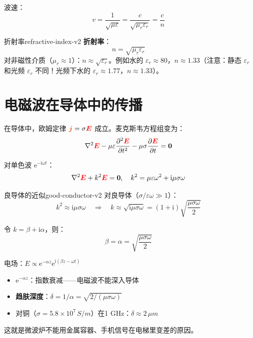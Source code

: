 \documentclass[11pt,a4paper,openany,oneside]{book}
\newcommand{\vecE}{\textcolor{red}{\vect{E}}}
\newcommand{\vecJ}{\textcolor{cororange}{\vect{j}}}
\newcommand{\ii}{\mathrm{i}}
\newcommand{\ee}{\mathrm{e}}
\newcommand{\eps}{\varepsilon}
\newcommand{\vect}[1]{\bm{#1}}
\newcommand{\lap}{\nabla^2}
\begin{document}
波速：
\[
v = \frac{1}{\sqrt{\mu\eps}} = \frac{c}{\sqrt{\mu_r\eps_r}} = \frac{c}{n}
\]

\begin{definition}{折射率}{refractive-index-v2}
\textbf{折射率}：
\[
n = \sqrt{\mu_r\eps_r}
\]
对非磁性介质（$\mu_r \approx 1$）：$n \approx \sqrt{\eps_r}$。例如水的 $\eps_r \approx 80$，$n \approx 1.33$（注意：静态 $\eps_r$ 和光频 $\eps_r$ 不同！光频下水的 $\eps_r \approx 1.77$，$n \approx 1.33$）。
\end{definition}

\section{电磁波在导体中的传播}

在导体中，欧姆定律 $\vecJ = \sigma\vecE$ 成立。麦克斯韦方程组变为：
\[
\lap\vecE - \mu\eps\frac{\partial^2\vecE}{\partial t^2} - \mu\sigma\frac{\partial\vecE}{\partial t} = \vect{0}
\]

对单色波 $\ee^{-\ii\omega t}$：
\[
\lap\vecE + k^2\vecE = \vect{0}, \quad k^2 = \mu\eps\omega^2 + \ii\mu\sigma\omega
\]

\begin{insight}{良导体的近似}{good-conductor-v2}
对良导体（$\sigma/\eps\omega \gg 1$）：
\[
k^2 \approx \ii\mu\sigma\omega \quad\Rightarrow\quad k \approx \sqrt{\ii\mu\sigma\omega} = (1+\ii)\sqrt{\frac{\mu\sigma\omega}{2}}
\]

令 $k = \beta + \ii\alpha$，则：
\[
\beta = \alpha = \sqrt{\frac{\mu\sigma\omega}{2}}
\]

电场：$E \propto \ee^{-\alpha z}\ee^{\ii(\beta z - \omega t)}$

\begin{itemize}
\item $\ee^{-\alpha z}$：指数衰减——电磁波不能深入导体
\item \textbf{趋肤深度}：$\delta = 1/\alpha = \sqrt{2/(\mu\sigma\omega)}$
\item 对铜（$\sigma = 5.8\times 10^7 \, \si{S/m}$）在1 GHz：$\delta \approx 2\,\si{\mu m}$
\end{itemize}

这就是微波炉不能用金属容器、手机信号在电梯里变差的原因。
\end{insight}
\end{document}
